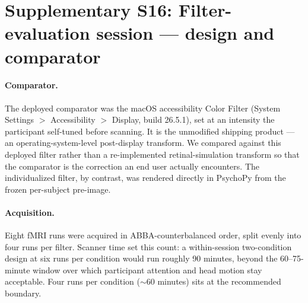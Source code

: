
\section*{Supplementary S16: Filter-evaluation session --- design and comparator}
\label{app:filter_eval}

\paragraph{Comparator.}
The deployed comparator was the macOS accessibility Color Filter (System Settings $>$ Accessibility $>$ Display, build 26.5.1), set at an intensity the participant self-tuned before scanning. It is the unmodified shipping product --- an operating-system-level post-display transform. We compared against this deployed filter rather than a re-implemented retinal-simulation transform so that the comparator is the correction an end user actually encounters. The individualized filter, by contrast, was rendered directly in PsychoPy from the frozen per-subject pre-image.

\paragraph{Acquisition.}
Eight fMRI runs were acquired in ABBA-counterbalanced order, split evenly into four runs per filter. Scanner time set this count: a within-session two-condition design at six runs per condition would run roughly 90 minutes, beyond the 60--75-minute window over which participant attention and head motion stay acceptable. Four runs per condition ($\sim$60 minutes) sits at the recommended boundary.

